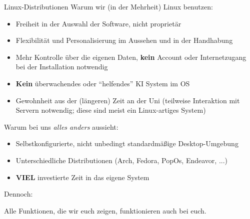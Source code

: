 \begin{frame}{Linux-Distributionen}
    Warum wir (in der Mehrheit) Linux benutzen:
    \begin{itemize}
        \item Freiheit in der Auswahl der Software, nicht proprietär
        \item Flexibilität und Personalisierung im Aussehen und in der Handhabung
        \item Mehr Kontrolle über die eigenen Daten, \textbf{kein} Account oder
          Internetzugang bei der Installation notwendig
        \item \textbf{Kein} überwachendes oder \enquote{helfendes} KI System im OS
        \item Gewohnheit aus der (längeren) Zeit an der Uni (teilweise Interaktion mit Servern
            notwendig; diese sind meist ein Linux-artiges System)
    \end{itemize}
    Warum bei uns \textit{alles anders} aussieht:
    \begin{itemize}
        \item Selbstkonfigurierte, nicht unbedingt standardmäßige Desktop-Umgebung
        \item Unterschiedliche Distributionen (Arch, Fedora, PopOs, Endeavor, ...)
        \item \textbf{VIEL} investierte Zeit in das eigene System
    \end{itemize}

    Dennoch:

    Alle Funktionen, die wir euch zeigen, funktionieren auch bei euch.

\end{frame}

